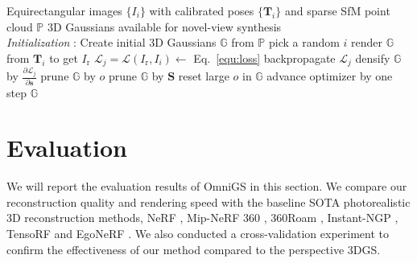 \documentclass[10pt,twocolumn,letterpaper]{article}
\begin{document}
\begin{algorithm}[t]
    \caption{Reconstruction Pipeline}
    \label{alg:reconstruction}
    \begin{algorithmic}[1]
            \renewcommand{\algorithmicrequire}{\textbf{Input:}}
            \renewcommand{\algorithmicensure}{\textbf{Output:}}
            \REQUIRE Equirectangular images $\{I_i\}$ with calibrated poses $\{\mathbf{T}_i\}$ and sparse SfM point cloud $\mathbb{P}$
            \ENSURE 3D Gaussians available for novel-view synthesis
            \\ \textit{Initialization} : Create initial 3D Gaussians $\mathbb{G}$ from $\mathbb{P}$
                \STATE pick a random $i$
                \STATE render $\mathbb{G}$ from $\mathbf{T}_i$ to get $I_\text{r}$ 
                \STATE $\mathcal{L}_j=\mathcal{L}(I_\text{r},I_i)\leftarrow$ Eq.~\eqref{equ:loss}
                \STATE backpropagate $\mathcal{L}_j$
                        \STATE densify $\mathbb{G}$ by $\displaystyle{\frac{\partial \mathcal{L}_j}{\partial \mathbf{s}}}$
                        \STATE prune $\mathbb{G}$ by $o$
                        \STATE prune $\mathbb{G}$ by $\mathbf{S}$
                    \ENDIF
                        \STATE reset large $o$ in $\mathbb{G}$
                    \ENDIF
                \ENDIF
                \STATE advance optimizer by one step
            \ENDFOR
            \RETURN $\mathbb{G}$ 
    \end{algorithmic}
\end{algorithm}

\section{Evaluation}
We will report the evaluation results of OmniGS in this section. We compare our reconstruction quality and rendering speed with the baseline SOTA photorealistic 3D reconstruction methods, NeRF \cite{nerf}, Mip-NeRF 360 \cite{nerf:mipnerf360}, 360Roam \cite{nerf:360roam}, Instant-NGP \cite{nerf:ingp}, TensoRF \cite{nerf:tensorf} and EgoNeRF \cite{nerf:egonerf}. We also conducted a cross-validation experiment to confirm the effectiveness of our method compared to the perspective 3DGS.
\end{document}
